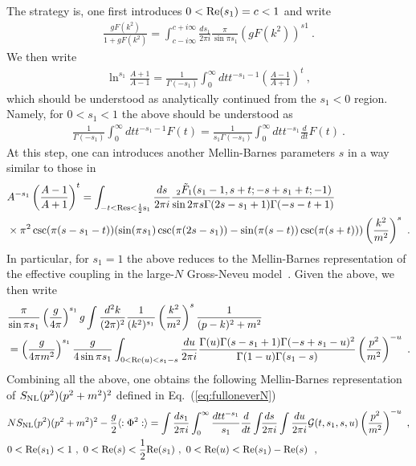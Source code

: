 \documentclass[a4paper,11pt]{article}
\begin{document}
The strategy is, one first introduces $0<{\rm Re }(s_1)=c<1$ and write 
\begin{align}
\frac{gF(k^2)}{1+gF(k^2)}=\int_{c-i\infty}^{c+i\infty} \frac{ds_1}{2\pi i} \frac{\pi}{\sin \pi s_1} (gF(k^2))^{s1} \ .
\end{align}
We then write 
\begin{align}
\ln^{s_1}\frac{A+1}{A-1}=\frac{1}{\Gamma(-s_1)}\int_{0}^{\infty} dt t^{-s_1-1} \left(\frac{A-1}{A+1}\right)^{t} \ ,
\end{align}
which should be understood as analytically continued from the $s_1<0$ region. Namely, for $0<s_1<1$ the above should be understood as 
\begin{align}
\frac{1}{\Gamma(-s_1)}\int_0^{\infty} dt t^{-s_1-1} F(t)=\frac{1}{s_1\Gamma(-s_1)}\int_0^{\infty} dt t^{-s_1} \frac{d}{dt} F(t) \ .
\end{align}
At this step, one can introduces another Mellin-Barnes parameters $s$ in a way similar to those in~\cite{Beneke:1998eq,Marino:2024uco,Liu:2024omb}
\begin{align}
&A^{-s_1}\left(\frac{A-1}{A+1}\right)^{t}=\int_{-t<\rm Re{s}<\frac{1}{2}s_1} \frac{ds}{2\pi i}\frac{  \, _2\tilde{F}_1(s_1-1,s+t;-s+s_1+t;-1) }{\sin 2\pi s \Gamma (2 s-s_1+1) \Gamma (-s-t+1)} \nonumber \\ 
& \times \pi ^2\csc (\pi  (s-s_1-t)) (\sin (\pi  s_1) \csc (\pi  (2 s-s_1))-\sin (\pi  (s-t)) \csc (\pi  (s+t))) \left(\frac{k^2}{m^2}\right)^s \ .
\end{align}
In particular, for $s_1=1$ the above reduces to the Mellin-Barnes representation of the effective coupling in the large-$N$ Gross-Neveu model~\cite{Marino:2024uco,Liu:2024omb}. Given the above, we then write
\begin{align}
&\frac{\pi}{\sin \pi s_1}\left(\frac{g}{4\pi}\right)^{s_1}g\int \frac{d^2k}{(2\pi)^2}\frac{1}{(k^2)^{s_1}}\left(\frac{k^2}{m^2}\right)^s\frac{1}{(p-k)^2+m^2} \nonumber \\ 
&=\left(\frac{g}{4\pi m^2}\right)^{s_1}\frac{g}{4\sin \pi s_1}\int_{0<{\rm Re}(u)<s_1-s} \frac{du}{2\pi i} \frac{\Gamma (u) \Gamma (s-s_1+1) \Gamma (-s+s_1-u)^2}{\Gamma (1-u) \Gamma (s_1-s)} \left(\frac{p^2}{m^2}\right)^{-u} \ .
\end{align}
Combining all the above, one obtains the following Mellin-Barnes representation of $S_{\rm NL}(p^2)(p^2+m^2)^2$ defined in Eq.~(\ref{eq:fulloneverN})
\begin{align}
& NS_{\rm NL}(p^2)(p^2+m^2)^2-\frac{g}{2}\langle :\Phi^2:\rangle=\int\frac{ds_1}{2\pi i}\int_0^{\infty} \frac{dt t^{-s_1}}{s_1}\frac{d}{dt}\int_{} \frac{ds}{2\pi i} \int \frac{du}{2\pi i}{\cal G}(t,s_1,s,u) \left(\frac{p^2}{m^2}\right)^{-u} \ , \\ 
& 0<{\rm Re}(s_1)<1 \ , \ 0<{\rm Re}(s)<\frac{1}{2}{\rm Re}(s_1) \ , \ 0<{\rm Re}(u)<{\rm Re}(s_1)-{\rm Re}(s) \  \ ,
\end{align}
\end{document}
